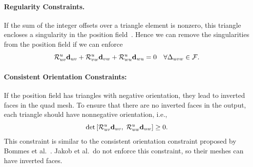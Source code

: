 \label{sec:quad-constraints}
\paragraph*{Regularity Constraints.}
If the sum of the integer offsets over a triangle element is nonzero, this triangle encloses a singularity in the position field~\cite{jakob2015instant}. Hence we can remove the singularities from the position field if we can enforce
\begin{equation}
\mathcal{R}^u_{uv}{\mathbf{d}}_{uv} + \mathcal{R}^u_{vw}{\mathbf{d}}_{vw} + \mathcal{R}^u_{wu}{\mathbf{d}}_{wu} = 0 \quad \forall \Delta_{uvw}\in \mathcal{F}.
\label{eq:quad-consistent}
\end{equation}

\paragraph*{Consistent Orientation Constraints:}
If the position field has triangles with negative orientation, they lead to inverted faces in the quad mesh. To ensure that there are no inverted faces in the output, each triangle should have nonnegative orientation, i.e.,
\begin{equation}
\text{det} \left[\mathcal{R}^u_{uv}{\mathbf{d}}_{uv},\;\mathcal{R}^u_{uw}{\mathbf{d}}_{uw}\right]\geq 0. \label{eq:quad-noflip}
\end{equation}
This constraint is similar to the consistent orientation constraint proposed by Bommes et al.~\cite{bommes2013integer}. Jakob et al.\ do not enforce this constraint, so their meshes can have inverted faces.

